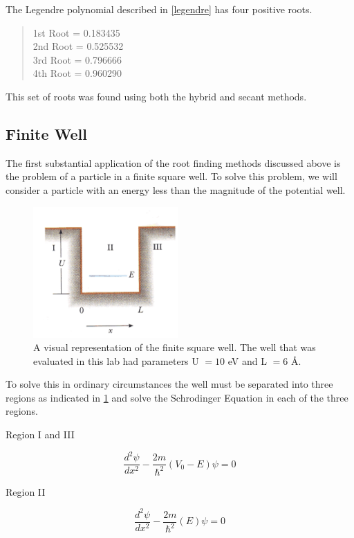 \documentclass[12pt]{article}
\begin{document}
The Legendre polynomial described in \eqref{legendre} has four positive roots.  
\begin{quote}
\begin{center}
1st Root = 0.183435 \\
2nd Root = 0.525532 \\
3rd Root = 0.796666 \\
4th Root = 0.960290 \\
\end{center}
\end{quote}
This set of roots was found using both the hybrid and secant methods.
\subsection{Finite Well}
The first substantial application of the root finding methods discussed above is the problem of a particle in a finite square well.  To solve this problem, we will consider a particle with an energy less than the magnitude of the potential well.
\begin{figure}[!h]
\centering
\includegraphics[width =50 mm, height = 50mm]{FiniteWell_diagram.pdf}
\caption{A visual representation of the finite square well.  The well that was evaluated in this lab had parameters U $= 10$ eV and L $=6$ \AA.}
\label{fig:FiniteWellDiagram}
\end{figure}
To solve this in ordinary circumstances the well must be separated into three regions as indicated in \ref{fig:FiniteWellDiagram} and solve the Schrodinger Equation in each of the three regions.
\begin{center}
Region I and III
\end{center}
\begin{equation}
\label{Shro1}
\frac{d^2\psi}{dx^2}-\frac{2m}{\hbar^2}(V_0-E)\psi=0
\end{equation}
\begin{center}
\pagebreak
Region II
\end{center}
\begin{equation}
\label{Shro2}
\frac{d^2\psi}{dx^2}-\frac{2m}{\hbar^2}(E)\psi=0
\end{equation}
\end{document}
